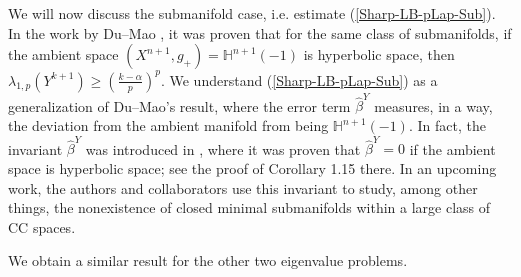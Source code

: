 \documentclass{amsart}
\newcommand{\Hyp}{\mathbb{H}^{n+1}(-1)}
\begin{document}
We will now discuss the submanifold case, i.e. estimate (\ref{Sharp-LB-pLap-Sub}). In the work by Du--Mao \cite{DuMao}, it was proven that for the same class of submanifolds, if the ambient space $(X^{n+1},g_+) = \Hyp$ is hyperbolic space, then $\lambda_{1,p}(Y^{k+1})\ge \left(\frac{k-\alpha}{p}\right)^p$. We understand (\ref{Sharp-LB-pLap-Sub}) as a generalization of Du--Mao's result, where the error term $\hat\beta^Y$ measures, in a way, the deviation from the ambient manifold from being $\Hyp$. In fact, the invariant $\hat \beta^Y$ was introduced in \cite{PerezAyalaTyrrell}, where it was proven that $\hat \beta^Y = 0$ if the ambient space is hyperbolic space; see the proof of Corollary 1.15 there. In an upcoming work, the authors and collaborators use this invariant to study, among other things, the nonexistence of closed minimal submanifolds within a large class of CC spaces.

We obtain a similar result for the other two eigenvalue problems.
\end{document}
